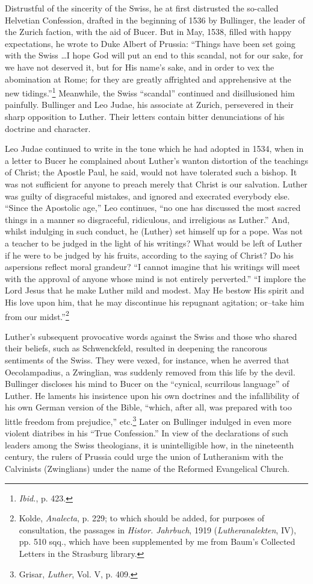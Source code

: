 Distrustful of the sincerity of the Swiss, he at first distrusted the so-called
Helvetian Confession, drafted in the beginning of 1536 by Bullinger, the
leader of the Zurich faction, with the aid of Bucer. But in May, 1538, filled
with happy expectations, he wrote to Duke Albert of Prussia: “Things have
been set going with the Swiss \dots I hope God will put an end to this
scandal, not for our sake, for we have not deserved it, but for His name’s sake,
and in order to vex the abomination at Rome; for they are greatly affrighted
and apprehensive at the new tidings.”\footnote{\textit{Ibid.}, p. 423.}
 Meanwhile, the Swiss “scandal”
continued and disillusioned him painfully. Bullinger and Leo Judae,
his associate at Zurich, persevered in their sharp opposition to Luther. Their letters
contain bitter denunciations of his doctrine and character.

Leo Judae continued to write in the tone which he had adopted in 1534,
when in a letter to Bucer he complained about Luther’s wanton distortion
of the teachings of Christ; the Apostle Paul, he said, would not have
tolerated such a bishop. It was not sufficient for anyone to preach merely that
Christ is our salvation. Luther was guilty of disgraceful mistakes, and
ignored and execrated everybody else. “Since the Apostolic age,” Leo continues,
“no one has discussed the most sacred things in a manner so disgraceful,
ridiculous, and irreligious as Luther.” And, whilst indulging in such conduct,
he (Luther) set himself up for a pope. Was not a teacher to be judged
in the light of his writings? What would be left of Luther if he were to be
judged by his fruits, according to the saying of Christ? Do his aspersions
reflect moral grandeur? “I cannot imagine that his writings will meet with
the approval of anyone whose mind is not entirely perverted.” “I implore
the Lord Jesus that he make Luther mild and modest. May He bestow His
spirit and His love upon him, that he may discontinue his repugnant agitation;
or--take him from our midst.”\footnote
{Kolde, \textit{Analecta}, p. 229; to which should be added, for purposes of consultation, the
passages in \textit{Histor. Jahrbuch}, 1919 (\textit{Lutheranalekten}, IV), pp. 510 sqq., which have been
supplemented by me from Baum’s Collected Letters in the Strasburg library.}

Luther’s subsequent provocative words against the Swiss and those
who shared their beliefs, such as Schwenckfeld, resulted in deepening
the rancorous sentiments of the Swiss. They were vexed, for instance,
when he averred that Oecolampadius, a Zwinglian, was suddenly removed
from this life by the devil. Bullinger discloses his
mind to Bucer on the “cynical, scurrilous language” of Luther. He
laments his insistence upon his own doctrines and the infallibility
of his own German version of the Bible, “which, after all, was prepared
with too little freedom from prejudice,” etc.\footnote{Grisar, \textit{Luther}, Vol. V, p. 409.}
Later on Bullinger indulged
in even more violent diatribes in his “True
Confession.” In view of the declarations of such leaders among the Swiss
theologians, it is unintelligible how, in the nineteenth century, the
rulers of Prussia could urge the union of Lutheranism with the Calvinists
(Zwinglians) under the name of the Reformed Evangelical
Church.
